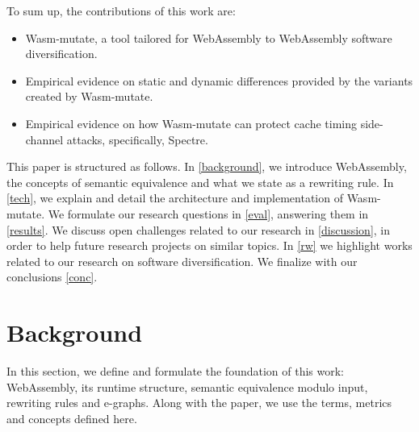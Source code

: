 \documentclass[sigplan,screen]{acmart}
\newcommand{\tool}{Wasm-mutate\xspace}
\begin{document}



To sum up, the contributions of this work are:

\begin{itemize}
    \item \tool, a tool tailored for WebAssembly to WebAssembly software diversification.
    \item Empirical evidence on static and dynamic differences provided by the variants created by \tool.
    \item Empirical evidence on how \tool can protect cache timing side-channel attacks, specifically, Spectre.
    
\end{itemize}

This paper is structured as follows. 
In \autoref{background}, we introduce WebAssembly, the concepts of semantic equivalence and what we state as a rewriting rule.
In \autoref{tech}, we explain and detail the architecture and implementation of \tool.
We formulate our research questions in \autoref{eval}, answering them in \autoref{results}.
We discuss open challenges related to our research in \autoref{discussion}, in order to help future research projects on similar topics.
In \autoref{rw} we highlight works related to our research on software diversification.
We finalize with our conclusions \autoref{conc}.

\section{Background}
\label{background}

In this section, we define and formulate the foundation of this work: WebAssembly, its runtime structure, semantic equivalence modulo input, rewriting rules and e-graphs.
Along with the paper, we use the terms, metrics and concepts defined here.
\end{document}
